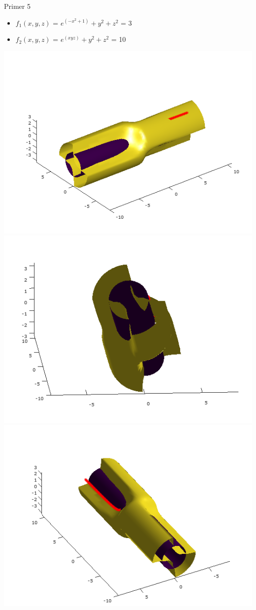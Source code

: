 \documentclass{beamer}
\begin{document}
\begin{frame}{Primer 5}
	\begin{itemize}  
		\item $f_{1}(x,y,z)$ = $e^{(-x^{2}+1)}+y^{2}+z^{2}$ = 3
		\item $f_{2}(x,y,z)$ = $e^{(xyz)}+y^{2}+z^{2}$ = 10
	\end{itemize} 
	\includegraphics[scale=0.3]{primer5_1}
	\includegraphics[scale=0.3]{primer5_2}
	\includegraphics[scale=0.3]{primer5_4} 
\end{frame}
\end{document}
